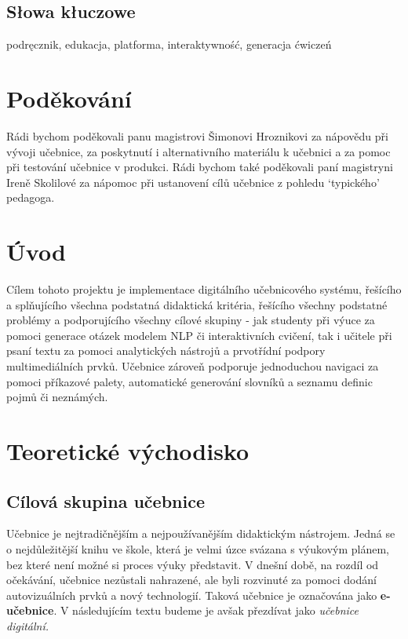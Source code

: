 \documentclass[12pt]{article}
\begin{document}
 	\subsection*{Słowa kłuczowe}
 	podręcznik, edukacja, platforma, interaktywność, generacja ćwiczeń

	\newpage

	\section*{Poděkování}
	Rádi bychom poděkovali panu magistrovi Šimonovi Hroznikovi za nápovědu při vývoji učebnice, za poskytnutí i alternativního materiálu k učebnici a za pomoc při testování učebnice v produkci. Rádi bychom také poděkovali paní magistryni Ireně Skolilové za nápomoc při ustanovení cílů učebnice z pohledu \enquote*{typického} pedagoga.


 	\newpage
	\tableofcontents{}

	\newpage
\section*{Úvod}
	Cílem tohoto projektu je implementace digitálního učebnicového systému, řešícího a splňujícího všechna podstatná didaktická kritéria, řešícího všechny podstatné problémy a podporujícího všechny cílové skupiny - jak studenty při výuce za pomoci generace otázek modelem NLP či interaktivních cvičení, tak i učitele při psaní textu za pomoci analytických nástrojů a prvotřídní podpory multimediálních prvků. Učebnice zároveň podporuje jednoduchou navigaci za pomoci příkazové palety, automatické generování slovníků a seznamu definic pojmů či neznámých.

	\newpage
\section{Teoretické východisko}
\subsection{Cílová skupina učebnice}
Učebnice je nejtradičnějším a nejpoužívanějším didaktickým nástrojem. Jedná se o nejdůležitější knihu ve škole, která je velmi úzce svázana s výukovým plánem, bez které není možné si proces výuky představit. V dnešní době, na rozdíl od očekávání, učebnice nezůstali nahrazené, ale byli rozvinuté za pomoci dodání autovizuálních prvků a nový technologií. Taková učebnice je označována jako \textbf{e-učebnice}.
\cite[str. 5]{PAN2023}
V následujícím textu budeme je avšak přezdívat jako \textit{učebnice digitální.}
\end{document}
